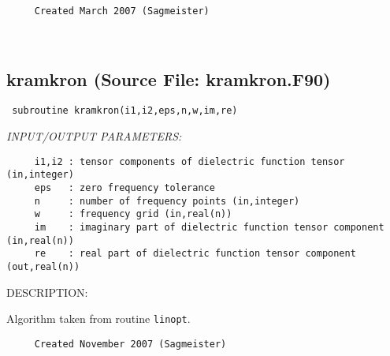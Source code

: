 \documentclass[11pt]{article}
\begin{document}
\begin{verbatim}     Created March 2007 (Sagmeister)\end{verbatim}




 
 
\mbox{}\hrulefill\ 
 
\subsection{kramkron (Source File: kramkron.F90)}


\begin{verbatim} subroutine kramkron(i1,i2,eps,n,w,im,re)\end{verbatim}{\em INPUT/OUTPUT PARAMETERS:}
\begin{verbatim}     i1,i2 : tensor components of dielectric function tensor (in,integer)
     eps   : zero frequency tolerance
     n     : number of frequency points (in,integer)
     w     : frequency grid (in,real(n))
     im    : imaginary part of dielectric function tensor component (in,real(n))
     re    : real part of dielectric function tensor component (out,real(n))\end{verbatim}
{\sf DESCRIPTION:\\ }


     Algorithm taken from routine {\tt linopt}.
  
\begin{verbatim}     Created November 2007 (Sagmeister)\end{verbatim}









\end{document}
